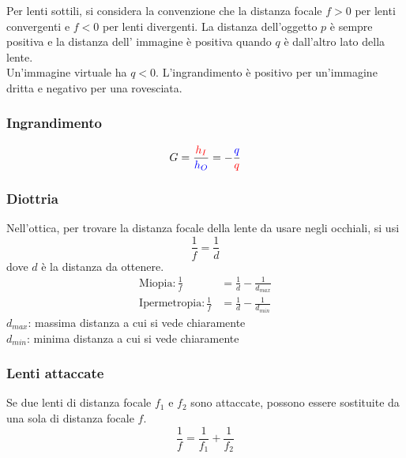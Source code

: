 \begin{center}
\end{center}
Per lenti sottili, si considera la convenzione che la distanza focale $f > 0$ per lenti convergenti
e $f<0$ per lenti divergenti. La distanza dell'oggetto $p$ è sempre positiva e la distanza dell'
immagine è positiva quando $q$ è dall'altro lato della lente.\\
Un'immagine virtuale ha $q < 0$. L'ingrandimento è positivo per un'immagine dritta e negativo per una
rovesciata.

\subsubsection{Ingrandimento}
\begin{equation*}
  G = \frac{\mathcolor{red}{h_I}}{\mathcolor{blue}{h_O}} =
  -\frac{\mathcolor{blue}{q}}{\mathcolor{red}{q}}
\end{equation*}

\subsubsection{Diottria}
Nell'ottica, per trovare la distanza focale della lente da usare negli occhiali, si usi
\begin{equation*}
  \frac{1}{f} =  \frac{1}{d} 
\end{equation*}
dove $d$ è la distanza da ottenere.
\begin{align*}
  \text{Miopia:}\,\frac{1}{f}&=\frac{1}{d}-\frac{1}{d_{max}}\\
  \text{Ipermetropia:}\,\frac{1}{f}&=\frac{1}{d}-\frac{1}{d_{min}} 
\end{align*}
$d_{max}$: massima distanza a cui si vede chiaramente\\
$d_{min}$: minima distanza a cui si vede chiaramente

\subsubsection{Lenti attaccate}
Se due lenti di distanza focale $f_1$ e $f_2$ sono attaccate, possono essere sostituite da una sola
di distanza focale $f$.
\begin{equation*}
  \frac{1}{f} = \frac{1}{f_1}+\frac{1}{f_2}
\end{equation*}

